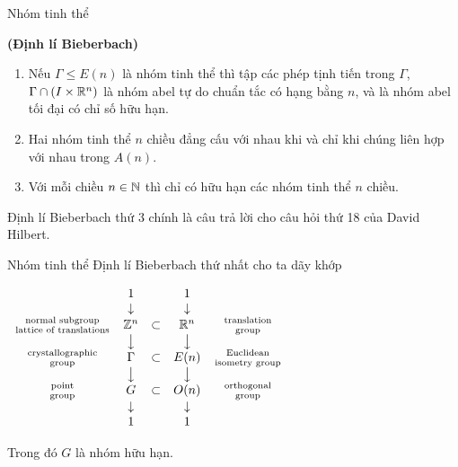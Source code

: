 
\begin{frame}{Nhóm tinh thể}
    \begin{theorem1}{\textbf{(Định lí Bieberbach)}}
        \begin{enumerate}
            \item Nếu $\Gamma \leq E(n)$ là nhóm tinh thể thì tập các phép tịnh tiến trong $\Gamma$, $\Gamma \cap (I \times \mathbb R^n)$ là nhóm abel tự do chuẩn tắc có hạng bằng $n$, và là nhóm abel tối đại có chỉ số hữu hạn.
            \item Hai nhóm tinh thể $n$ chiều đẳng cấu với nhau khi và chỉ khi chúng liên hợp với nhau trong $A(n)$.
            \item Với mỗi chiều $n \in \mathbb N$ thì chỉ có hữu hạn các nhóm tinh thể $n$ chiều.
        \end{enumerate}
    \end{theorem1}
    Định lí Bieberbach thứ 3 chính là câu trả lời cho câu hỏi thứ 18 của David Hilbert.
\end{frame}

\begin{frame}{Nhóm tinh thể}
    Định lí Bieberbach thứ nhất cho ta dãy khớp
    \begin{center}
        $\begin{array}{ccccc}
            & 1 && 1 \\ & \downarrow && \downarrow \\ {\text{normal subgroup} \atop \text{lattice of translations}} & \mathbb Z^n &\subset& \mathbb R^n & {\text{translation} \atop \text{group}} \\ & \big\downarrow && \big\downarrow \\ {\text{crystallographic} \atop \text{group}} & \Gamma &\subset& E(n) & {\text{Euclidean} \atop \text{isometry group}} \\ & \big\downarrow && \big\downarrow \\ {\text{point} \atop \text{group}} & G &\subset& O(n) & {\text{orthogonal} \atop \text{group}} \\ & \downarrow && \downarrow \\ & 1 && 1
        \end{array}$
    \end{center}
    Trong đó $G$ là nhóm hữu hạn.
\end{frame}

